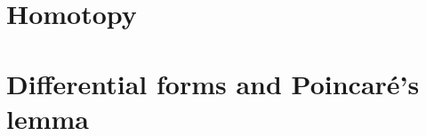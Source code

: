 \documentclass[main.tex]{subfiles}
\begin{document}
\appendix

\section{Homotopy}

\section{Differential forms and Poincaré's lemma}
\end{document}
